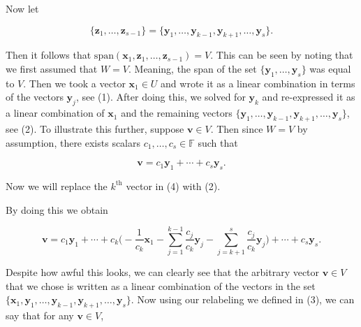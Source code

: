 \documentclass[12pt, a4paper]{article}
\begin{document}
 \vspace{2mm}
 
 \noindent Now let
 
 \begin{equation}
     \{\mathbf{z}_1,\dots,\mathbf{z}_{s-1}\}=\{\mathbf{y}_1,\dots,\mathbf{y}_{k-1},\mathbf{y}_{k+1},\dots, \mathbf{y}_s\}.
 \end{equation}
 
 \vspace{2mm}
 
 \noindent Then it follows that $\text{span}(\mathbf{x}_1,\mathbf{z}_1,\dots, \mathbf{z}_{s-1})=V$. This can be seen by noting that we first assumed that $W=V$. Meaning, the span of the set $\{\mathbf{y}_1,\dots, \mathbf{y}_s\}$ was equal to $V$. Then we took a vector $\mathbf{x}_1\in U$ and wrote it as a linear combination in terms of the vectors $\mathbf{y}_j$, see (1). After doing this, we solved for $\mathbf{y}_k$ and re-expressed it as a linear combination of $\mathbf{x}_1$ and the remaining vectors $\{\mathbf{y}_1,\dots,\mathbf{y}_{k-1},\mathbf{y}_{k+1},\dots, \mathbf{y}_s\}$, see (2). To illustrate this further, suppose $\mathbf{v}\in V$. Then since $W=V$ by assumption, there exists scalars $c_1,\dots, c_s\in\mathbb{F}$ such that
 
 \begin{equation}
     \mathbf{v}=c_1\mathbf{y}_1+\cdots+c_s\mathbf{y}_s.
 \end{equation}
 
 \vspace{2mm}
 
 \noindent Now we will replace the $k^{\text{th}}$ vector in (4) with (2).
 
 \newpage
 
 \noindent By doing this we obtain
 
 \begin{equation}
     \mathbf{v}=c_1\mathbf{y}_1+\cdots+c_k\bigg(-\frac{1}{c_k}\mathbf{x}_1-\sum\limits_{j=1}^{k-1}\frac{c_j}{c_k}\mathbf{y}_j-\sum\limits_{j=k+1}^s\frac{c_j}{c_k}\mathbf{y}_j\bigg)+\cdots+c_s\mathbf{y}_s.
 \end{equation}
 
 \vspace{2mm}
 
 \noindent Despite how awful this looks, we can clearly see that the arbitrary vector $\mathbf{v}\in V$ that we chose is written as a linear combination of the vectors in the set $\{\mathbf{x}_1,\mathbf{y}_1,\dots,\mathbf{y}_{k-1},\mathbf{y}_{k+1},\dots, \mathbf{y}_s\}$. Now using our relabeling we defined in (3), we can say that for any $\mathbf{v}\in V$,
 
\end{document}
